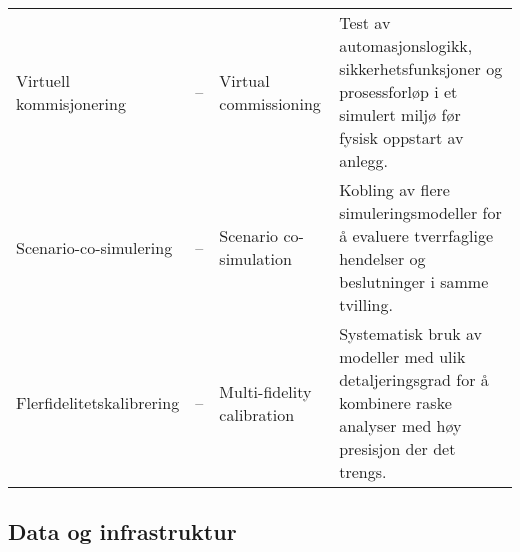 \begin{longtable}{p{}p{}p{}p{}}
Virtuell kommisjonering & -- & Virtual commissioning & Test av automasjonslogikk, sikkerhetsfunksjoner og prosessforløp i et simulert miljø før fysisk oppstart av anlegg. \citep{boschert2018digital} \\
Scenario-co-simulering & -- & Scenario co-simulation & Kobling av flere simuleringsmodeller for å evaluere tverrfaglige hendelser og beslutninger i samme tvilling. \citep{boschert2018digital} \\
Flerfidelitetskalibrering & -- & Multi-fidelity calibration & Systematisk bruk av modeller med ulik detaljeringsgrad for å kombinere raske analyser med høy presisjon der det trengs. \citep{kennedy2000predicting} \\
\bottomrule
\end{longtable}

\subsection{Data og infrastruktur}
